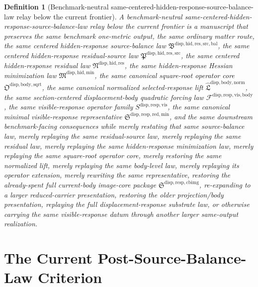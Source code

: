\documentclass[11pt]{article}
\newcommand{\SourceBalanceLawPackage}{\mathfrak B^{\mathrm{disp,hid,res,src,bal}}}
\newcommand{\ResidualSourceLawPackage}{\mathfrak P^{\mathrm{disp,hid,res,src}}}
\newcommand{\ResidualLawPackage}{\mathfrak N^{\mathrm{disp,hid,res}}}
\newcommand{\HiddenMinimizationPackage}{\mathfrak M^{\mathrm{disp,hid,min}}}
\newcommand{\SquareRootOperatorCore}{\mathfrak O^{\mathrm{disp,body,sqrt}}}
\newcommand{\NormalizedLiftPackage}{\widehat{\mathfrak L}^{\mathrm{disp,body,norm}}}
\newcommand{\VisibleBodyForcingLaw}{\mathscr F^{\mathrm{disp,resp,vis,body}}}
\newcommand{\VisibleResponseOperator}{S^{\mathrm{disp,resp,vis}}}
\newcommand{\MinimalReducedStructure}{\mathfrak S^{\mathrm{disp,resp,red,min}}}
\newcommand{\CurrentBodyImageCore}{\mathfrak S^{\mathrm{disp,resp,cbimg}}}
\newtheorem{definition}{Definition}
\begin{document}
\begin{definition}[Benchmark-neutral same-centered-hidden-response-source-balance-law relay below the current frontier]
A \emph{benchmark-neutral same-centered-hidden-response-source-balance-law relay below the current frontier} is a manuscript that preserves the same benchmark one-metric output, the same ordinary matter route, the same centered hidden-response source-balance law \(\SourceBalanceLawPackage\), the same centered hidden-response residual-source law \(\ResidualSourceLawPackage\), the same centered hidden-response residual law \(\ResidualLawPackage\), the same hidden-response Hessian minimization law \(\HiddenMinimizationPackage\), the same canonical square-root operator core \(\SquareRootOperatorCore\), the same canonical normalized selected-response lift \(\NormalizedLiftPackage\), the same section-centered displacement-body quadratic forcing law \(\VisibleBodyForcingLaw\), the same visible-response operator family \(\VisibleResponseOperator\), the same canonical minimal visible-response representative \(\MinimalReducedStructure\), and the same downstream benchmark-facing consequences while merely restating that same source-balance law, merely replaying the same residual-source law, merely replaying the same residual law, merely replaying the same hidden-response minimization law, merely replaying the same square-root operator core, merely restoring the same normalized lift, merely replaying the same body-level law, merely replaying its operator extension, merely rewriting the same representative, restoring the already-spent full current-body image-core package \(\CurrentBodyImageCore\), re-expanding to a larger reduced-carrier presentation, restoring the older projection/body presentation, replaying the full displacement-response substrate law, or otherwise carrying the same visible-response datum through another larger same-output realization.
\end{definition}

\section{The Current Post-Source-Balance-Law Criterion}
\end{document}
